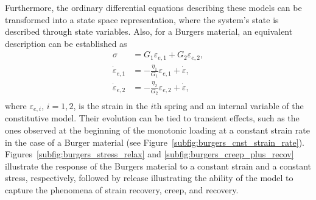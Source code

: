 Furthermore, the ordinary differential equations describing these models can be transformed into a state space representation, where the system's state is described through state variables.
Also, for a Burgers material, an equivalent description can be established as
\begin{align}
\label{eq:state_var_desc_burgers}
	\sigma &= G_1\varepsilon_{e,1} + G_2\varepsilon_{e,2},\\
	\dot \varepsilon_{e,1} &= -\frac{\eta_1}{G_1}\varepsilon_{e,1} + \dot \varepsilon,\\
	\dot \varepsilon_{e,2} &= -\frac{\eta_2}{G_2}\varepsilon_{e,2} + \dot \varepsilon,\\
\end{align}
where $\varepsilon_{e, i}$, $i=1,2$, is the strain in the $i$th spring and an internal variable of the constitutive model.
Their evolution can be tied to transient effects, such as the ones observed at the beginning of the monotonic loading at a constant strain rate in the case of a Burger material (see Figure~\ref{subfig:burgers_cnst_strain_rate}).
Figures~\ref{subfig:burgers_stress_relax} and \ref{subfig:burgers_creep_plus_recov} illustrate the response of the Burgers material to a constant strain and a constant stress, respectively, followed by release illustrating the ability of the model to capture the phenomena of strain recovery, creep, and recovery.
